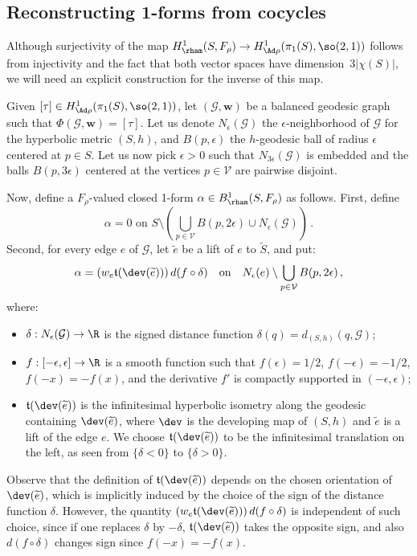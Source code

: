 \subsection{Reconstructing 1-forms from cocycles} Although surjectivity of the map $H^1_{\rham}(S,F_\rho)\to H^1_{\Ad\rho}(\pi_1(S),\so(2,1))$ follows from injectivity and the fact that both vector spaces have dimension~$3|\chi(S)|$, we will need an explicit construction for the inverse of this map.

Given $[\tau]\in H^1_{\Ad\rho}(\pi_1(S),\so(2,1))$, let $(\mathcal G,\mathbf w)$ be a balanced geodesic graph such that $\Phi(\mathcal G,\mathbf w)=[\tau]$. Let us denote $N_\epsilon(\mathcal G)$ the $\epsilon$-neighborhood of $\mathcal G$ for the hyperbolic metric $(S,h)$, and $B(p,\epsilon)$ the $h$-geodesic ball of radius $\epsilon$ centered at $p\in S$. Let us now pick $\epsilon>0$ such that $N_{3\epsilon}(\mathcal G)$ is embedded and the balls $B(p,3\epsilon)$ centered at the vertices $p\in\mathcal V$ are pairwise disjoint.

Now, define a $F_\rho$-valued closed 1-form $\alpha\in B^1_{\rham}(S,F_\rho)$ as follows. First, define
\[
\alpha=0\text{ on }S\setminus \left(\bigcup_{p\in\mathcal V}B(p,2\epsilon)\cup N_\epsilon(\mathcal G)\right)\,.
\]
Second, for every edge $e$ of $\mathcal G$, let $\widetilde e$ be a lift of $e$ to $\widetilde S$, and put:
\begin{equation}\label{eq defi derham form}
\alpha=\left(w_e {\mathfrak t}(\dev(\widetilde e))\right) d(f\circ \delta)\quad\text{on}\quad N_\epsilon(e)\setminus \bigcup_{p\in\mathcal V}B(p,2\epsilon)\,,
\end{equation}
where:
\begin{itemize}
\item $\delta:N_\epsilon(\mathcal G)\to\R$ is the signed distance function $\delta(q)=d_{(S,h)}(q,\mathcal G)$;
\item $f:[-\epsilon,\epsilon]\to \R$ is a smooth function such that $f(\epsilon)=1/2$, $f(-\epsilon)=-1/2$, $f(-x)=-f(x)$, and the derivative $f'$ is compactly supported in $(-\epsilon,\epsilon)$;
\item $\mathfrak t(\dev(\widetilde e))$ is the infinitesimal hyperbolic isometry along the geodesic containing $\dev(\widetilde e)$, where $\dev$ is the developing map of $(S,h)$ and $\widetilde e$ is a lift of the edge $e$. We choose $\mathfrak t(\dev(\widetilde e))$ to be the infinitesimal translation on the left, as seen from $\{\delta<0\}$ to $\{\delta>0\}$.
\end{itemize}
Observe that the definition of $\mathfrak t(\dev(\widetilde e))$ depends on the chosen orientation of $\dev(\widetilde e)$, which is implicitly induced by the choice of the sign of the distance function $\delta$. However, the quantity $\left(w_e {\mathfrak t}(\dev(\widetilde e))\right) d(f\circ \delta)$ is independent of such choice, since if one replaces $\delta$ by $-\delta$, ${\mathfrak t}(\dev(\widetilde e))$ takes the opposite sign, and also $d(f\circ \delta)$ changes sign since $f(-x)=-f(x)$.

